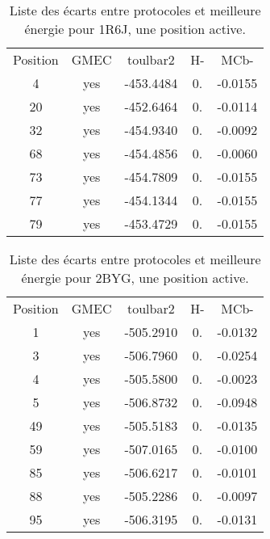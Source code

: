     \begin{table}[h]
      \centering

      \begin{tabular}{ccccc}


        \toprule
        Position & GMEC & toulbar2 & H- & MCb- \\
        \cmidrule{1-5}
         4 & yes & -453.4484 & 0. & -0.0155  \\
        20 & yes & -452.6464 & 0. & -0.0114 \\
        32 & yes & -454.9340 & 0. & -0.0092 \\
        68 & yes & -454.4856 & 0. & -0.0060 \\
        73 & yes & -454.7809 & 0. & -0.0155 \\
        77 & yes & -454.1344 & 0. & -0.0155 \\
        79 & yes & -453.4729 & 0. & -0.0155 \\
        \bottomrule
      \end{tabular}      
      \caption{Liste des écarts entre protocoles et meilleure énergie pour 1R6J, une position active.}
\label{tab:result_1_active_1R6J}
    \end{table}

    \begin{table}[h]
      \centering

      \begin{tabular}{ccccc}

        \toprule
        Position & GMEC & toulbar2 & H- & MCb- \\
        \cmidrule{1-5}
        1  & yes &  -505.2910 & 0. & -0.0132 \\
        3  & yes &  -506.7960 & 0. & -0.0254 \\
        4  & yes &  -505.5800 & 0. & -0.0023 \\
        5  & yes &  -506.8732 & 0. & -0.0948 \\
        49 & yes &  -505.5183 & 0. & -0.0135 \\
        59 & yes &  -507.0165 & 0. & -0.0100 \\
        85 & yes &  -506.6217 & 0. & -0.0101 \\
        88 & yes &  -505.2286 & 0. & -0.0097 \\
        95 & yes &  -506.3195 & 0. & -0.0131 \\
        \bottomrule
      \end{tabular}      
      \caption{Liste des écarts entre protocoles et meilleure énergie pour 2BYG, une position active.}
\label{tab:result_1_active_2BYG}
    \end{table}


